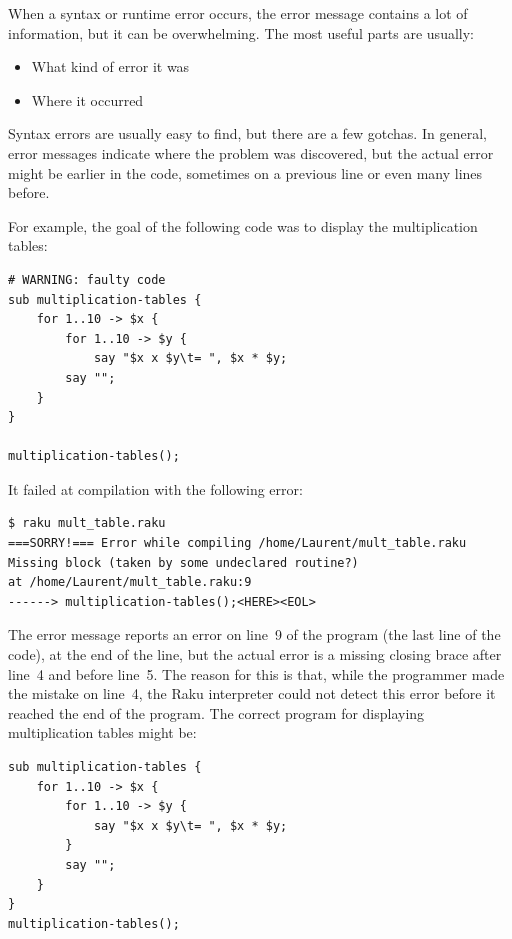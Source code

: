When a syntax or runtime error occurs, the error message contains
a lot of information, but it can be overwhelming.  The most
useful parts are usually:

\begin{itemize}

\item What kind of error it was

\item Where it occurred

\end{itemize}

Syntax errors are usually easy to find, but there are a few
gotchas. In general, error messages indicate where the problem 
was discovered, but the actual error might be earlier in 
the code, sometimes on a previous line or even many lines 
before.

For example, the goal of the following code was to display the 
multiplication tables:

\begin{verbatim}
# WARNING: faulty code
sub multiplication-tables {
    for 1..10 -> $x {
        for 1..10 -> $y {
            say "$x x $y\t= ", $x * $y;
        say "";
    }
}

multiplication-tables();
\end{verbatim}

It failed at compilation with the following error:

\begin{verbatim}
$ raku mult_table.raku
===SORRY!=== Error while compiling /home/Laurent/mult_table.raku
Missing block (taken by some undeclared routine?)
at /home/Laurent/mult_table.raku:9
------> multiplication-tables();<HERE><EOL>
\end{verbatim}

The error message reports an error on line~9 of the program 
(the last line of the code), at the end of the line, but 
the actual error is a missing closing brace after line~4 
and before line~5. The reason for this is that, while the 
programmer made the mistake on line~4, the Raku interpreter 
could not detect this error before it reached the 
end of the program. The correct program for displaying 
multiplication tables might be:

\begin{verbatim}
sub multiplication-tables {
    for 1..10 -> $x {
        for 1..10 -> $y {
            say "$x x $y\t= ", $x * $y;
        }
        say "";
    }
}
multiplication-tables();
\end{verbatim}

